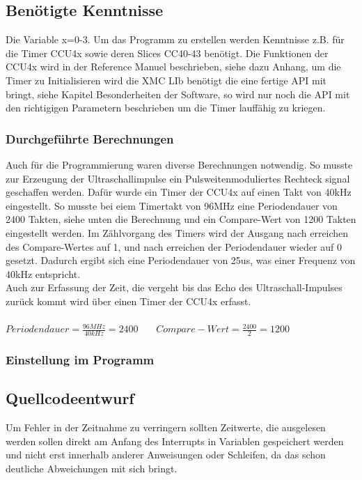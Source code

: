 \subsection{Benötigte Kenntnisse}
Die Variable x=0-3.
Um das Programm zu erstellen werden Kenntnisse z.B. für die Timer CCU4x sowie deren Slices CC40-43 benötigt. Die Funktionen der CCU4x wird in der Reference Manuel beschrieben, siehe dazu Anhang, um die Timer zu Initialisieren wird die XMC LIb benötigt die eine fertige API mit bringt, siehe Kapitel Besonderheiten der Software, so wird nur noch die API mit den richtigigen Parametern beschrieben um die Timer lauffähig zu kriegen. 

\subsubsection{Durchgeführte Berechnungen}
Auch für die Programmierung waren diverse Berechnungen notwendig. So musste zur Erzeugung der Ultraschallimpulse ein Pulsweitenmoduliertes Rechteck signal geschaffen werden. Dafür wurde ein Timer der CCU4x auf einen Takt von 40kHz eingestellt. So musste bei eiem Timertakt von 96MHz eine Periodendauer von 2400 Takten, siehe unten die Berechnung und ein Compare-Wert von 1200 Takten eingestellt werden. Im Zählvorgang des Timers wird der Ausgang nach erreichen des Compare-Wertes auf 1, und nach erreichen der Periodendauer wieder auf 0 gesetzt. Dadurch ergibt sich eine Periodendauer von 25us, was einer Frequenz von 40kHz entspricht.\\
Auch zur Erfassung der Zeit, die vergeht bis das Echo des Ultraschall-Impulses zurück kommt wird über einen Timer der CCU4x erfasst. 
\onehalfspacing \\ \\
\(\displaystyle Periodendauer=\frac{96MHz}{40kHz} = 2400 \)  \  \  \    \(\displaystyle Compare-Wert=\frac{2400}{2} = 1200 \) 
\singlespacing
\subsubsection{Einstellung im Programm}

\subsection{Quellcodeentwurf}
Um Fehler in der Zeitnahme zu verringern sollten Zeitwerte, die ausgelesen werden sollen direkt am Anfang des Interrupts in Variablen gespeichert werden und nicht erst innerhalb anderer Anweisungen oder Schleifen, da das schon deutliche Abweichungen mit sich bringt.\\

